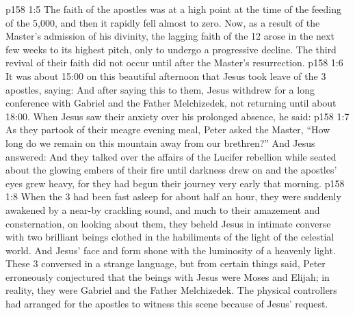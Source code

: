 \vs p158 1:5 The faith of the apostles was at a high point at the time of the feeding of the 5,000, and then it rapidly fell almost to zero. Now, as a result of the Master’s admission of his divinity, the lagging faith of the 12 arose in the next few weeks to its highest pitch, only to undergo a progressive decline. The third revival of their faith did not occur until after the Master’s resurrection.
\vs p158 1:6 It was about 15:00 on this beautiful afternoon that Jesus took leave of the 3 apostles, saying:  And after saying this to them, Jesus withdrew for a long conference with Gabriel and the Father Melchizedek, not returning until about 18:00. When Jesus saw their anxiety over his prolonged absence, he said: 
\vs p158 1:7 As they partook of their meagre evening meal, Peter asked the Master, “How long do we remain on this mountain away from our brethren?” And Jesus answered:  And they talked over the affairs of the Lucifer rebellion while seated about the glowing embers of their fire until darkness drew on and the apostles’ eyes grew heavy, for they had begun their journey very early that morning.
\vs p158 1:8 When the 3 had been fast asleep for about half an hour, they were suddenly awakened by a near\hyp{}by crackling sound, and much to their amazement and consternation, on looking about them, they beheld Jesus in intimate converse with two brilliant beings clothed in the habiliments of the light of the celestial world. And Jesus’ face and form shone with the luminosity of a heavenly light. These 3 conversed in a strange language, but from certain things said, Peter erroneously conjectured that the beings with Jesus were Moses and Elijah; in reality, they were Gabriel and the Father Melchizedek. The physical controllers had arranged for the apostles to witness this scene because of Jesus’ request.
